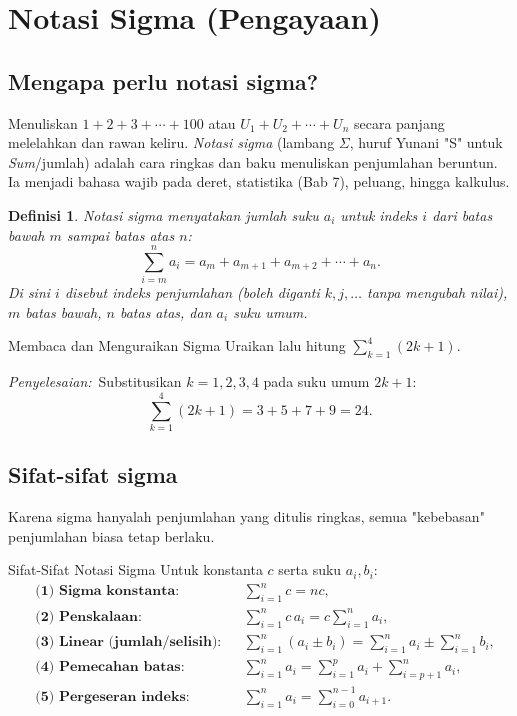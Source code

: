 \documentclass[11pt,a4paper]{report}
\theoremstyle{gaya}
\newtheorem{definisi}{Definisi}[chapter]
\newcommand{\jawab}{\par\smallskip\noindent\textit{\textcolor{oranye}{Penyelesaian:}}\ }
\begin{document}
\section{Notasi Sigma (Pengayaan)}

\subsection*{Mengapa perlu notasi sigma?}
Menuliskan $1+2+3+\cdots+100$ atau $U_1+U_2+\cdots+U_n$ secara panjang melelahkan dan rawan keliru. \emph{Notasi sigma} (lambang $\Sigma$, huruf Yunani "S" untuk \emph{Sum}/jumlah) adalah cara ringkas dan baku menuliskan penjumlahan beruntun. Ia menjadi bahasa wajib pada deret, statistika (Bab 7), peluang, hingga kalkulus.

\begin{definisi}
\emph{Notasi sigma} menyatakan jumlah suku $a_i$ untuk indeks $i$ dari batas bawah $m$ sampai batas atas $n$:
\[
\sum_{i=m}^{n} a_i = a_m + a_{m+1} + a_{m+2} + \cdots + a_n .
\]
Di sini $i$ disebut \emph{indeks penjumlahan} (boleh diganti $k,j,\dots$ tanpa mengubah nilai), $m$ batas bawah, $n$ batas atas, dan $a_i$ \emph{suku umum}.
\end{definisi}

\begin{contoh}{Membaca dan Menguraikan Sigma}
Uraikan lalu hitung $\displaystyle\sum_{k=1}^{4}(2k+1)$.

\jawab Substitusikan $k=1,2,3,4$ pada suku umum $2k+1$:
\[
\sum_{k=1}^{4}(2k+1)=3+5+7+9=24.
\]
\end{contoh}

\subsection*{Sifat-sifat sigma}
Karena sigma hanyalah penjumlahan yang ditulis ringkas, semua "kebebasan" penjumlahan biasa tetap berlaku.

\begin{konsep}{Sifat-Sifat Notasi Sigma}
Untuk konstanta $c$ serta suku $a_i,b_i$:
\[
\begin{aligned}
&\textbf{(1) Sigma konstanta:} && \sum_{i=1}^{n} c = nc, \\
&\textbf{(2) Penskalaan:} && \sum_{i=1}^{n} c\,a_i = c\sum_{i=1}^{n} a_i, \\
&\textbf{(3) Linear (jumlah/selisih):} && \sum_{i=1}^{n}(a_i\pm b_i)=\sum_{i=1}^{n}a_i\pm\sum_{i=1}^{n}b_i, \\
&\textbf{(4) Pemecahan batas:} && \sum_{i=1}^{n}a_i=\sum_{i=1}^{p}a_i+\sum_{i=p+1}^{n}a_i, \\
&\textbf{(5) Pergeseran indeks:} && \sum_{i=1}^{n}a_i=\sum_{i=0}^{n-1}a_{i+1}.
\end{aligned}
\]
\end{konsep}
\end{document}
